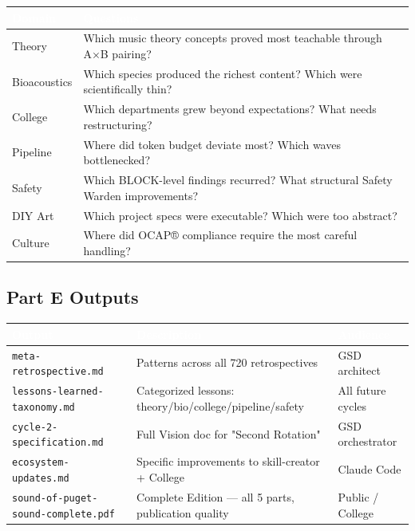 \documentclass[11pt,letterpaper]{article}
\newcommand{\tblhdr}[1]{\textbf{\sffamily\textcolor{white}{#1}}}
\begin{document}
\begin{center}
\begin{tabularx}{\textwidth}{L{3cm}X}
\toprule
{}
\tblhdr{Domain} & \tblhdr{Questions} \\
\midrule
Theory & Which music theory concepts proved most teachable through A×B pairing? \\
Bioacoustics & Which species produced the richest content? Which were scientifically thin? \\
College & Which departments grew beyond expectations? What needs restructuring? \\
Pipeline & Where did token budget deviate most? Which waves bottlenecked? \\
Safety & Which BLOCK-level findings recurred? What structural Safety Warden improvements? \\
DIY Art & Which project specs were executable? Which were too abstract? \\
Culture & Where did OCAP® compliance require the most careful handling? \\
\bottomrule
\end{tabularx}
\end{center}

\subsection{Part E Outputs}

\begin{center}
\begin{tabularx}{\textwidth}{L{5cm}XL{3.5cm}}
\toprule
{}
\tblhdr{Output} & \tblhdr{Description} & \tblhdr{Audience} \\
\midrule
\texttt{meta-retrospective.md} & Patterns across all 720 retrospectives & GSD architect \\
\texttt{lessons-learned-taxonomy.md} & Categorized lessons: theory/bio/college/pipeline/safety & All future cycles \\
\texttt{cycle-2-specification.md} & Full Vision doc for "Second Rotation" & GSD orchestrator \\
\texttt{ecosystem-updates.md} & Specific improvements to skill-creator + College & Claude Code \\
\texttt{sound-of-puget-sound-complete.pdf} & Complete Edition — all 5 parts, publication quality & Public / College \\
\bottomrule
\end{tabularx}
\end{center}
\end{document}
